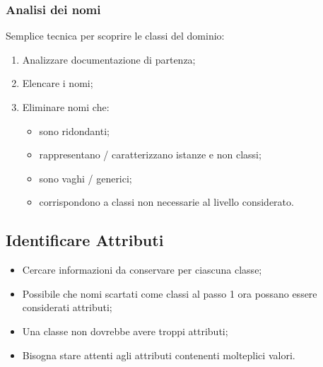 \documentclass{article}
\begin{document}
      \subsubsection{Analisi dei nomi}
        Semplice tecnica per scoprire le classi del dominio:
        \begin{enumerate}
          \item Analizzare documentazione di partenza; 
          \item Elencare i nomi; 
          \item Eliminare nomi che:
            \begin{itemize}
              \item sono ridondanti; 
              \item rappresentano / caratterizzano istanze e non classi;
              \item sono vaghi / generici;
              \item corrispondono a classi non necessarie al livello considerato.
            \end{itemize}
        \end{enumerate}
    \subsection{Identificare Attributi}
      \begin{itemize}
        \item Cercare informazioni da conservare per ciascuna classe; 
        \item Possibile che nomi scartati come classi al passo 1 ora possano essere considerati attributi;
        \item Una classe non dovrebbe avere troppi attributi;
        \item Bisogna stare attenti agli attributi contenenti molteplici valori.
      \end{itemize}
\end{document}
